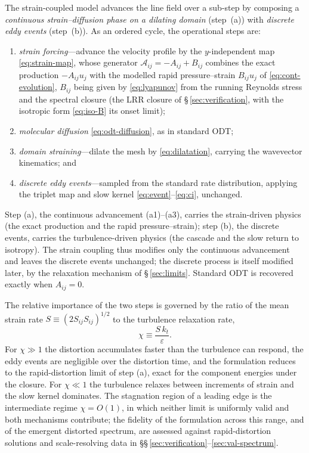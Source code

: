 \documentclass[lineno]{JFM-FLM_Au}
\begin{document}
The strain-coupled model advances the line field over a sub-step by
composing a \emph{continuous strain--diffusion phase on a dilating
domain} (step~(a)) with \emph{discrete eddy events} (step~(b)). As an
ordered cycle, the operational steps are:
\begin{enumerate}
\item[(a1)] \emph{strain forcing}---advance the velocity profile by the
  $y$-independent map \eqref{eq:strain-map}, whose generator
  $\mathcal{A}_{ij}=-A_{ij}+B_{ij}$ combines the exact production
  $-A_{ij}u_j$ with the modelled rapid pressure--strain $B_{ij}u_j$ of
  \eqref{eq:cont-evolution}, $B_{ij}$ being given by \eqref{eq:lyapunov}
  from the running Reynolds stress and the spectral closure (the LRR
  closure of \S\,\ref{sec:verification}, with the isotropic form
  \eqref{eq:iso-B} its onset limit);
\item[(a2)] \emph{molecular diffusion} \eqref{eq:odt-diffusion}, as in
  standard ODT;
\item[(a3)] \emph{domain straining}---dilate the mesh by
  \eqref{eq:dilatation}, carrying the wavevector kinematics; and
\item[(b)] \emph{discrete eddy events}---sampled from the standard rate
  distribution, applying the triplet map and slow kernel
  \eqref{eq:event}--\eqref{eq:ci}, unchanged.
\end{enumerate}
Step (a), the continuous advancement (a1)--(a3), carries the
strain-driven physics (the exact production and the rapid
pressure--strain); step (b), the discrete events, carries the
turbulence-driven physics (the cascade and the slow return to isotropy).
The strain coupling thus modifies only the continuous advancement and
leaves the discrete events unchanged; the discrete process is itself
modified later, by the relaxation mechanism of \S\,\ref{sec:limits}.
Standard ODT is recovered exactly when $A_{ij}=0$.

The relative importance of the two steps is governed by the ratio of the
mean strain rate $S\equiv(2S_{ij}S_{ij})^{1/2}$ to the turbulence
relaxation rate,
\begin{equation}
  \chi \equiv \frac{S\,k_t}{\varepsilon}.
  \label{eq:chi}
\end{equation}
For $\chi\gg1$ the distortion accumulates faster than the turbulence can
respond, the eddy events are negligible over the distortion time, and the
formulation reduces to the rapid-distortion limit of step (a), exact for
the component energies under the closure. For $\chi\ll1$ the turbulence
relaxes between increments of strain and the slow kernel dominates. The
stagnation region of a leading edge is the intermediate regime
$\chi=O(1)$, in which neither limit is uniformly valid and both
mechanisms contribute; the fidelity of the formulation across this range,
and of the emergent distorted spectrum, are assessed against
rapid-distortion solutions and scale-resolving data in
\S\S\,\ref{sec:verification}--\ref{sec:val-spectrum}.
\end{document}
